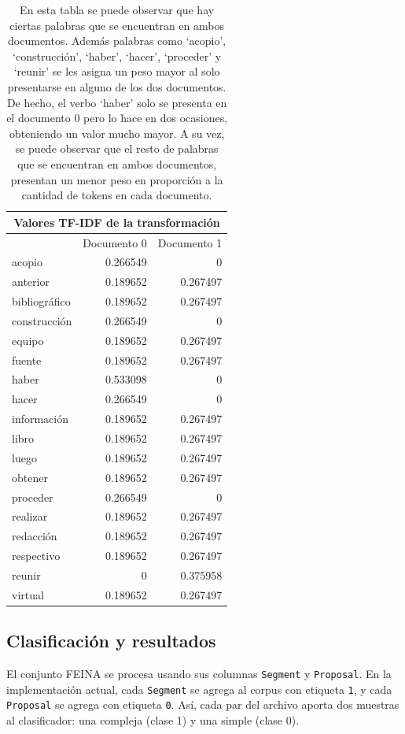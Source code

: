 \documentclass[12pt]{article}
\newcommand{\claseSimple}{\texttt{0}}
\newcommand{\claseCompleja}{\texttt{1}}
\begin{document}
\begin{table}[H]
\centering
\begin{tabular}{lrr}
\multicolumn{3}{c}{Valores TF-IDF de la transformación} \\
\toprule
 & Documento 0 & Documento 1 \\
\midrule
acopio & 0.266549 & 0 \\
anterior & 0.189652 & 0.267497 \\
bibliográfico & 0.189652 & 0.267497 \\
construcción & 0.266549 & 0 \\
equipo & 0.189652 & 0.267497 \\
fuente & 0.189652 & 0.267497 \\
haber & 0.533098 & 0 \\
hacer & 0.266549 & 0 \\
información & 0.189652 & 0.267497 \\
libro & 0.189652 & 0.267497 \\
luego & 0.189652 & 0.267497 \\
obtener & 0.189652 & 0.267497 \\
proceder & 0.266549 & 0 \\
realizar & 0.189652 & 0.267497 \\
redacción & 0.189652 & 0.267497 \\
respectivo & 0.189652 & 0.267497 \\
reunir & 0 & 0.375958 \\
virtual & 0.189652 & 0.267497 \\
\bottomrule
\end{tabular}
\caption{En esta tabla se puede observar que hay ciertas palabras que se encuentran en ambos documentos. Además palabras como `acopio', `construcción', `haber', `hacer', `proceder' y `reunir' se les asigna un peso mayor al solo presentarse en alguno de los dos documentos. De hecho, el verbo `haber' solo se presenta en el documento 0 pero lo hace en dos ocasiones, obteniendo un valor mucho mayor. A su vez, se puede observar que el resto de palabras que se encuentran en ambos documentos, presentan un menor peso en proporción a la cantidad de tokens en cada documento.}
\end{table}


\subsection{Clasificación y resultados}

El conjunto FEINA se procesa usando sus columnas \texttt{Segment} y \texttt{Proposal}. En la implementación actual, cada \texttt{Segment} se agrega al corpus con etiqueta \claseCompleja{}, y cada \texttt{Proposal} se agrega con etiqueta \claseSimple{}. Así, cada par del archivo aporta dos muestras al clasificador: una compleja (clase 1) y una simple (clase 0).
\end{document}
